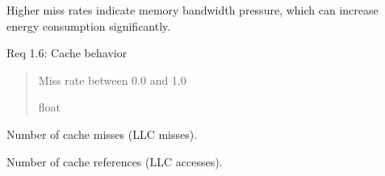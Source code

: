 \documentclass[letterpaper,10pt,english]{sphinxmanual}
\begin{document}
\begin{fulllineitems}
\begin{fulllineitems}
\sphinxAtStartPar
Higher miss rates indicate memory bandwidth pressure,
which can increase energy consumption significantly.

\sphinxAtStartPar
Req 1.6: Cache behavior
\begin{quote}\begin{description}
\sphinxAtStartPar
Miss rate between 0.0 and 1.0

\sphinxAtStartPar
float

\end{description}\end{quote}

\end{fulllineitems}


\begin{fulllineitems}
\label{\detokenize{core.models.performance_counters:core.models.performance_counters.PerformanceCounters.cache_misses}}
\pysigstartsignatures
\pysigline
{}
\pysigstopsignatures
\sphinxAtStartPar
Number of cache misses (LLC misses).

\end{fulllineitems}


\begin{fulllineitems}
\label{\detokenize{core.models.performance_counters:core.models.performance_counters.PerformanceCounters.cache_references}}
\pysigstartsignatures
\pysigline
{}
\pysigstopsignatures
\sphinxAtStartPar
Number of cache references (LLC accesses).

\end{fulllineitems}



\end{fulllineitems}
\end{document}
